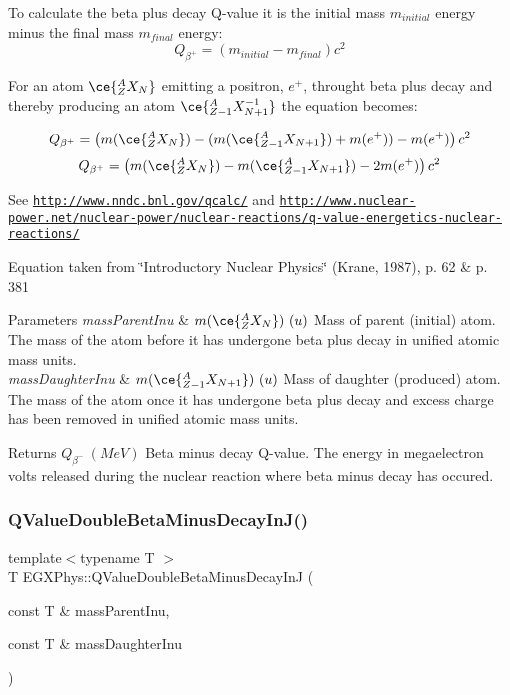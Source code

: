 To calculate the beta plus decay Q-\/value it is the initial mass $m_{initial}$ energy minus the final mass $m_{final}$ energy\+: \[Q_{\beta^+} = \left ( m_{initial}-m_{final}\right ) c^2\]

For an atom $\ce{ ^{A}_{Z}X_{N} }$ emitting a positron, $e^+$, throught beta plus decay and thereby producing an atom $\ce{ ^{A}_{Z{-1}}X^{-1}_{N{+1}} }$ the equation becomes\+:

\[Q_{\beta^+} = \left ( m(\ce{ ^{A}_{Z}X_{N} }) - (m(\ce{ ^{A}_{Z{-1}}X_{N{+1}} }) + m(e^+)) - m(e^+)\right ) c^2\] \[Q_{\beta^+} = \left ( m(\ce{ ^{A}_{Z}X_{N} }) - m(\ce{ ^{A}_{Z{-1}}X_{N{+1}} }) - 2m(e^+)\right ) c^2\]

See \href{http://www.nndc.bnl.gov/qcalc/}{\tt http\+://www.\+nndc.\+bnl.\+gov/qcalc/} and \href{http://www.nuclear-power.net/nuclear-power/nuclear-reactions/q-value-energetics-nuclear-reactions/}{\tt http\+://www.\+nuclear-\/power.\+net/nuclear-\/power/nuclear-\/reactions/q-\/value-\/energetics-\/nuclear-\/reactions/}

Equation taken from \char`\"{}\+Introductory Nuclear Physics\char`\"{} (Krane, 1987), p. 62 \& p. 381


\begin{DoxyParams}{Parameters}
{\em mass\+Parent\+Inu} & $m(\ce{ ^{A}_{Z}X_{N} })\ (u)$ Mass of parent (initial) atom. The mass of the atom before it has undergone beta plus decay in unified atomic mass units. \\
\hline
{\em mass\+Daughter\+Inu} & $m(\ce{ ^{A}_{Z{-1}}X_{N{+1}} })\ (u)$ Mass of daughter (produced) atom. The mass of the atom once it has undergone beta plus decay and excess charge has been removed in unified atomic mass units. \\
\hline
\end{DoxyParams}
\begin{DoxyReturn}{Returns}
$Q_{\beta^-}\ (MeV)$ Beta minus decay Q-\/value. The energy in megaelectron volts released during the nuclear reaction where beta minus decay has occured. 
\end{DoxyReturn}
\mbox{\label{group___q_value_gaf19d189152aec04d8b1ebbbe8792540b}} 
\subsubsection{\texorpdfstring{Q\+Value\+Double\+Beta\+Minus\+Decay\+In\+J()}{QValueDoubleBetaMinusDecayInJ()}}
{\footnotesize\ttfamily template$<$typename T $>$ \\
T E\+G\+X\+Phys\+::\+Q\+Value\+Double\+Beta\+Minus\+Decay\+InJ (\begin{DoxyParamCaption}\item[{const T \&}]{mass\+Parent\+Inu,  }\item[{const T \&}]{mass\+Daughter\+Inu }\end{DoxyParamCaption})}



